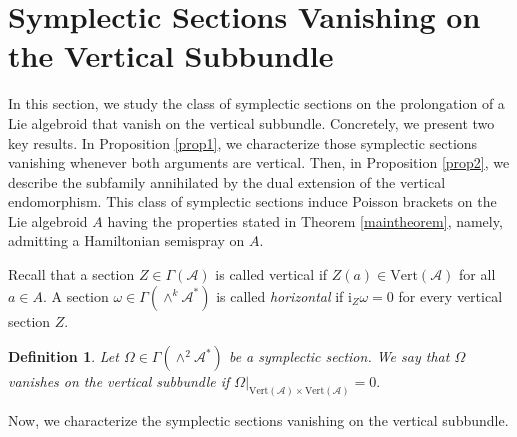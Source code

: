 \documentclass[12pt,letterpaper]{article}
\newtheorem{definition}[theorem]{Definition}
\numberwithin{equation}{section}
\begin{document}
\section{Symplectic Sections Vanishing on the Vertical Subbundle}\label{sec:vanish}

In this section, we study the class of symplectic sections on the prolongation of a Lie algebroid that vanish on the vertical subbundle. 
Concretely, we present two key results. 
In Proposition \ref{prop1}, we characterize those symplectic sections vanishing whenever both arguments are vertical. 
Then, in Proposition \ref{prop2}, we describe the subfamily annihilated by the dual extension of the vertical endomorphism.
This class of symplectic sections induce Poisson brackets on the Lie algebroid $A$
having the properties stated in Theorem \ref{maintheorem}, namely,
admitting a Hamiltonian semispray on $A$.



Recall that a section $Z\in \Gamma(\mathscr{A})$ is called vertical if $Z(a)\in \mathrm{Vert}(\mathscr{A})$ for all $a\in A$. 
A section $\omega \in \Gamma(\wedge^k \mathscr{A}^*)$ is called \emph{horizontal} if $\mathrm{i}_Z\omega =0$ for every vertical section $Z$. 

\begin{definition}
Let $\Omega \in \Gamma(\wedge^2 \mathscr{A}^*) $ be a symplectic section. We say that $\Omega$ vanishes on the vertical subbundle if  $\left. \Omega \right|_{\mathrm{Vert}(\mathscr{A}) \times \mathrm{Vert}(\mathscr{A})}=0.$
\end{definition}

Now, we characterize the symplectic sections vanishing on the vertical subbundle.
\end{document}

